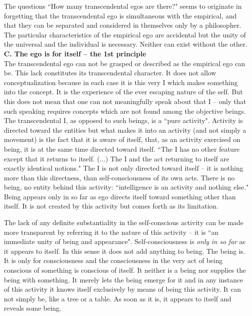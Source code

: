 The questions ``How many transcendental egos are there?" seems to originate in forgetting that the transcendental 
ego is simultaneous with the empirical, and that they can be separated and considered in themselves only by a 
philosopher. The particular characteristics of the empirical ego are accidental but the unity of the universal and the 
individual is necessary. Neither can  exist without the other. \\[1ex]
{\bf C. The ego is for itself -- the 1st principle}\\
 The transcendental ego can not be grasped or described as the empirical ego can be. This lack constitutes its 
transcendental character. It does not allow conceptualization because in each case it is this very I which makes 
something into the concept. It is the experience of the ever escaping nature of the self. But this does not mean that 
one can not meaningfully speak about that I -- only that such speaking requires concepts which are not found 
among the objective beings. The transcendental I, as opposed to such beings, is a ``pure activity". Activity is 
directed toward the entities but what makes it into an activity (and not simply a movement) is the fact that it is 
aware of itself, that, as an activity exercised on being, it is at the same time directed toward itself. ``The I has no 
other feature except that it returns to itself. (...) The I and the act returning to itself are exactly identical notions." \cite{ITS} 
The I is not only directed toward itself -- it is nothing more than this directness, than self-consciousness of its own 
acts. There is no being, no entity behind this activity: ``intelligence is an activity and nothing else." \cite{ITS} Being 
appears only in so far as ego directs itself toward something other than itself. It is not created by this activity but 
comes forth as its limitation.

The lack of any definite substantiality in the self-conscious activity can be made more transparent by referring it 
to the nature of this activity -- it is ``an immediate unity of being and appearance". \cite{ITS} Self-consciousness is {\em only in so far} as it appears to itself. In this sense it does not add anything to being. The being is. It is only for 
consciousness and the consciousness in the very act of being conscious of something is conscious of itself. It 
neither is a being nor supplies the being with something. It merely lets the being emerge for it and in any instance 
of this activity it knows itself exclusively by means of being this activity. It can not simply be, like a tree or a 
table. As soon as it is, it appears to itself and reveals some being.

